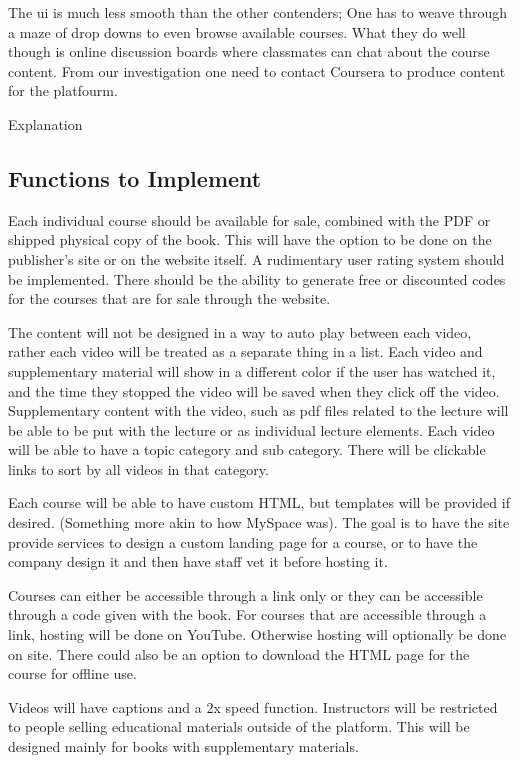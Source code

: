 \documentclass{article}
\begin{document}
The ui is much less smooth than the other contenders; One has to weave through
a maze of drop downs to even browse available courses. What they do well though
is online discussion boards where classmates can chat about the course content.
From our investigation one need to contact Coursera to produce content for the
platfourm.

Explanation

\subsection{Functions to Implement}

Each individual course should be available for sale, combined with the PDF or shipped physical copy of the book. This will have the option to be done on the publisher's site or on the website itself. A rudimentary user rating system should be implemented. There should be the ability to generate free or discounted codes for the courses that are for sale through the website.

The content will not be designed in a way to auto play between each video, rather each video will be treated as a separate thing in a list. Each video and supplementary material will show in a different color if the user has watched it, and the time they stopped the video will be saved when they click off the video. Supplementary content with the video, such as pdf files related to the lecture will be able to be put with the lecture or as individual lecture elements. Each video will be able to have a topic category and sub category. There will be clickable links to sort by all videos in that category.

Each course will be able to have custom HTML, but templates will be provided if desired. (Something more akin to how MySpace was). The goal is to have the site provide services to design a custom landing page for a course, or to have the company design it and then have staff vet it before hosting it.

Courses can either be accessible through a link only or they can be accessible through a code given with the book. For courses that are accessible through a link, hosting will be done on YouTube. Otherwise hosting will optionally be done on site. There could also be an option to download the HTML page for the course for offline use.

Videos will have captions and a 2x speed function. Instructors will be restricted to people selling educational materials outside of the platform. This will be designed mainly for books with supplementary materials.
\end{document}
